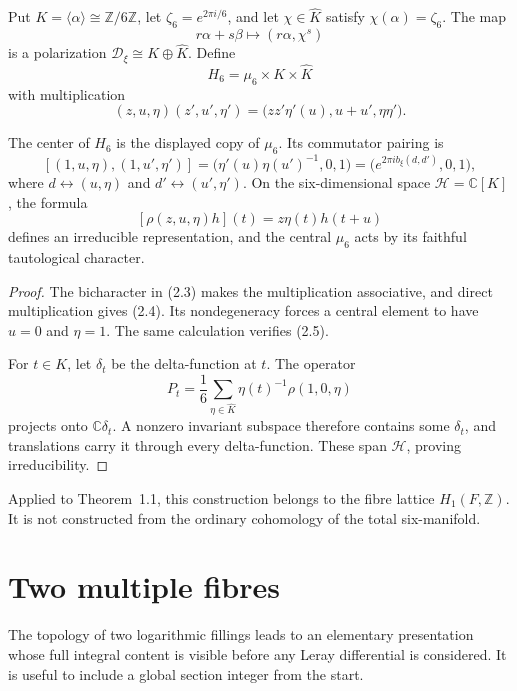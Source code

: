 \documentclass[11pt]{article}
\numberwithin{equation}{section}
\begin{document}
Put $K=\langle\alpha\rangle\cong\mathbb Z/6\mathbb Z$, let
$\zeta_6=e^{2\pi i/6}$, and let $\chi\in\widehat K$ satisfy
$\chi(\alpha)=\zeta_6$.  The map
\[
          r\alpha+s\beta\longmapsto(r\alpha,\chi^s)
\]
is a polarization $\mathcal D_\xi\cong K\oplus\widehat K$.  Define
\[
 H_6=\mu_6\times K\times\widehat K
\]
with multiplication
\[
 (z,u,\eta)(z',u',\eta')
   =\bigl(zz'\eta'(u),u+u',\eta\eta'\bigr).                       \tag{2.3}
\]

\begin{theorem}
The center of $H_6$ is the displayed copy of $\mu_6$.  Its commutator
pairing is
\[
 [(1,u,\eta),(1,u',\eta')]
  =\bigl(\eta'(u)\eta(u')^{-1},0,1\bigr)
  =\bigl(e^{2\pi i b_\xi(d,d')},0,1\bigr),                        \tag{2.4}
\]
where $d\leftrightarrow(u,\eta)$ and $d'\leftrightarrow(u',\eta')$.
On the six-dimensional space $\mathcal H=\mathbb C[K]$, the formula
\[
 [\rho(z,u,\eta)h](t)=z\eta(t)h(t+u)                              \tag{2.5}
\]
defines an irreducible representation, and the central $\mu_6$ acts by its
faithful tautological character.
\end{theorem}

\begin{proof}
The bicharacter in (2.3) makes the multiplication associative, and direct
multiplication gives (2.4).  Its nondegeneracy forces a central element to
have $u=0$ and $\eta=1$.  The same calculation verifies (2.5).

For $t\in K$, let $\delta_t$ be the delta-function at $t$.  The operator
\[
 P_t=\frac16\sum_{\eta\in\widehat K}
        \eta(t)^{-1}\rho(1,0,\eta)
\]
projects onto $\mathbb C\delta_t$.  A nonzero invariant subspace therefore
contains some $\delta_t$, and translations carry it through every
delta-function.  These span $\mathcal H$, proving irreducibility.
\end{proof}

Applied to Theorem~1.1, this construction belongs to the fibre lattice
$H_1(F,\mathbb Z)$.  It is not constructed from the ordinary cohomology of
the total six-manifold.

\section{Two multiple fibres}

The topology of two logarithmic fillings leads to an elementary presentation
whose full integral content is visible before any Leray differential is
considered.  It is useful to include a global section integer from the start.
\end{document}
